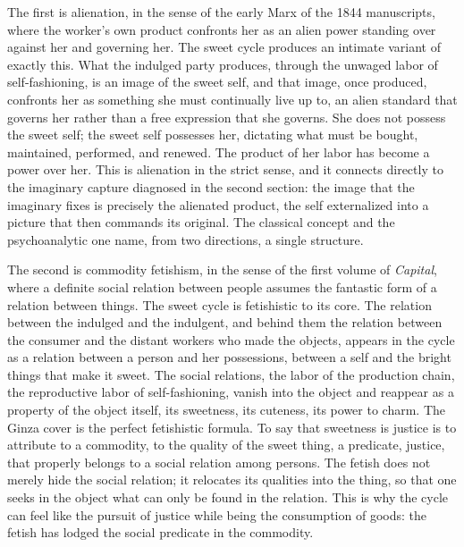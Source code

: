\documentclass[11pt,a4paper]{article}
\begin{document}
The first is alienation, in the sense of the early Marx of the 1844 manuscripts, where the worker's own product confronts her as an alien power standing over against her and governing her. The sweet cycle produces an intimate variant of exactly this. What the indulged party produces, through the unwaged labor of self-fashioning, is an image of the sweet self, and that image, once produced, confronts her as something she must continually live up to, an alien standard that governs her rather than a free expression that she governs. She does not possess the sweet self; the sweet self possesses her, dictating what must be bought, maintained, performed, and renewed. The product of her labor has become a power over her. This is alienation in the strict sense, and it connects directly to the imaginary capture diagnosed in the second section: the image that the imaginary fixes is precisely the alienated product, the self externalized into a picture that then commands its original. The classical concept and the psychoanalytic one name, from two directions, a single structure.

The second is commodity fetishism, in the sense of the first volume of \textit{Capital}, where a definite social relation between people assumes the fantastic form of a relation between things. The sweet cycle is fetishistic to its core. The relation between the indulged and the indulgent, and behind them the relation between the consumer and the distant workers who made the objects, appears in the cycle as a relation between a person and her possessions, between a self and the bright things that make it sweet. The social relations, the labor of the production chain, the reproductive labor of self-fashioning, vanish into the object and reappear as a property of the object itself, its sweetness, its cuteness, its power to charm. The Ginza cover is the perfect fetishistic formula. To say that sweetness is justice is to attribute to a commodity, to the quality of the sweet thing, a predicate, justice, that properly belongs to a social relation among persons. The fetish does not merely hide the social relation; it relocates its qualities into the thing, so that one seeks in the object what can only be found in the relation. This is why the cycle can feel like the pursuit of justice while being the consumption of goods: the fetish has lodged the social predicate in the commodity.
\end{document}
